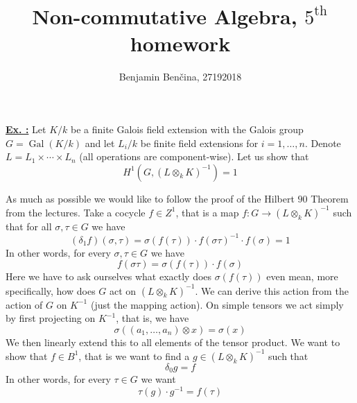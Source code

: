 \documentclass[a4paper, 12pt]{article}
\title{Non-commutative Algebra, $5^{\text{th}}$ homework}
\author{Benjamin Benčina, 27192018}
\DeclareMathOperator{\Gal}{Gal}
\newcounter{excounter}[section]
\newenvironment{Exercise}
    {\refstepcounter{excounter}\underline{\textbf{Ex. \theexcounter:}}}
    {\par\vspace{\baselineskip}}
\begin{document}
\maketitle

\begin{Exercise}
    Let $K/k$ be a finite Galois field extension with the Galois group $G = \Gal(K/k)$ and let $L_i/k$ be finite field extensions for $i = 1, \dots, n$.
    Denote $L = L_1 \times \cdots \times L_n$ (all operations are component-wise).
    Let us show that
    \[
        H^1(G, (L \otimes_k K)^{-1}) = 1
    \]

    As much as possible we would like to follow the proof of the Hilbert $90$ Theorem from the lectures.
    Take a cocycle $f \in Z^1$, that is a map $f \colon G \to (L \otimes_k K)^{-1}$ such that for all $\sigma, \tau \in G$ we have
    \[
        (\delta_1 f)(\sigma, \tau) = \sigma(f(\tau)) \cdot f(\sigma\tau)^{-1} \cdot f(\sigma) = 1
    \]
    In other words, for every $\sigma, \tau \in G$ we have
    \begin{equation}
        f(\sigma\tau) = \sigma(f(\tau)) \cdot f(\sigma)
        \label{eq:cocycle}
    \end{equation}
    Here we have to ask ourselves what exactly does $\sigma(f(\tau))$ even mean, more specifically, how does $G$ act on $(L \otimes_k K)^{-1}$.
    We can derive this action from the action of $G$ on $K^{-1}$ (just the mapping action).
    On simple tensors we act simply by first projecting on $K^{-1}$, that is, we have
    \[
        \sigma((a_1,\dots,a_n)\otimes x) = \sigma(x)
    \]
    We then linearly extend this to all elements of the tensor product.
    We want to show that $f \in B^1$, that is we want to find a $g \in (L \otimes_k K)^{-1}$ such that
    \[
        \delta_0 g = f
    \]
    In other words, for every $\tau \in G$ we want
    \begin{equation}
        \tau(g) \cdot g^{-1} = f(\tau)
        \label{eq:coboundary}
    \end{equation}
    

\end{Exercise}
\end{document}

